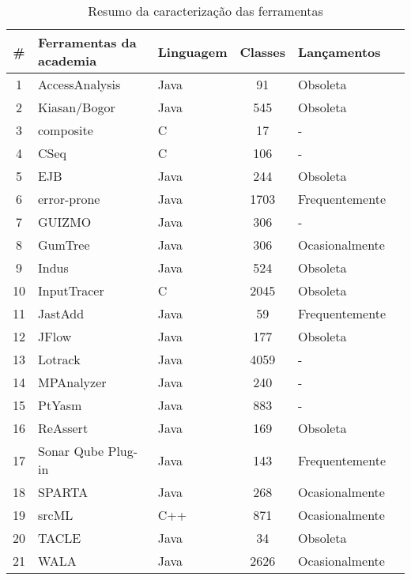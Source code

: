 \begin{table}[H]
  \caption{Resumo da caracterização das ferramentas}
  \centering
  \begin{tabular}{| c | l | l | c | l | l |}
    \hline
    \#  & Ferramentas da academia & Linguagem & Classes & Lançamentos \\
    \hline
    1  & AccessAnalysis          & Java   & 91    & Obsoleta       \\
    2  & Kiasan/Bogor            & Java   & 545   & Obsoleta       \\
    3  & composite               & C      & 17    & -              \\
    4  & CSeq                    & C      & 106   & -              \\
    5  & EJB                     & Java   & 244   & Obsoleta       \\
    6  & error-prone             & Java   & 1703  & Frequentemente \\
    7  & GUIZMO                  & Java   & 306   & -              \\
    8  & GumTree                 & Java   & 306   & Ocasionalmente \\
    9  & Indus                   & Java   & 524   & Obsoleta       \\
    10 & InputTracer             & C      & 2045  & Obsoleta       \\
    11 & JastAdd                 & Java   & 59    & Frequentemente \\
    12 & JFlow                   & Java   & 177   & Obsoleta       \\
    13 & Lotrack                 & Java   & 4059  & -              \\
    14 & MPAnalyzer              & Java   & 240   & -              \\
    15 & PtYasm                  & Java   & 883   & -              \\
    16 & ReAssert                & Java   & 169   & Obsoleta       \\
    17 & Sonar Qube Plug-in      & Java   & 143   & Frequentemente \\
    18 & SPARTA                  & Java   & 268   & Ocasionalmente \\
    19 & srcML                   & C++    & 871   & Ocasionalmente \\
    20 & TACLE                   & Java   & 34    & Obsoleta       \\
    21 & WALA                    & Java   & 2626  & Ocasionalmente \\

\end{tabular}
\end{table}
